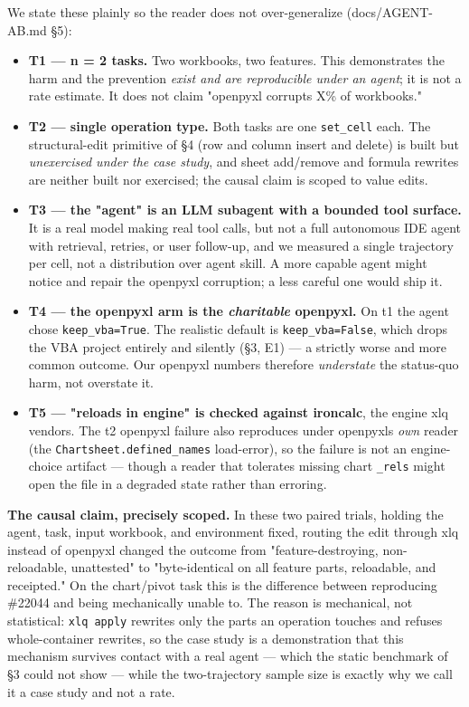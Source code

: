 \documentclass[
]{article}
\providecommand{\tightlist}{%
  \setlength{\itemsep}{0pt}\setlength{\parskip}{0pt}}
\begin{document}
We state these plainly so the reader does not over-generalize
(docs/AGENT-AB.md §5):

\begin{itemize}
\tightlist
\item
  \textbf{T1 --- n = 2 tasks.} Two workbooks, two features. This
  demonstrates the harm and the prevention \emph{exist and are
  reproducible under an agent}; it is not a rate estimate. It does not
  claim "openpyxl corrupts X\% of workbooks."
\item
  \textbf{T2 --- single operation type.} Both tasks are one
  \texttt{set\_cell} each. The structural-edit primitive of §4 (row and
  column insert and delete) is built but \emph{unexercised under the
  case study}, and sheet add/remove and formula rewrites are neither
  built nor exercised; the causal claim is scoped to value edits.
\item
  \textbf{T3 --- the "agent" is an LLM subagent with a bounded tool
  surface.} It is a real model making real tool calls, but not a full
  autonomous IDE agent with retrieval, retries, or user follow-up, and
  we measured a single trajectory per cell, not a distribution over
  agent skill. A more capable agent might notice and repair the openpyxl
  corruption; a less careful one would ship it.
\item
  \textbf{T4 --- the openpyxl arm is the \emph{charitable} openpyxl.} On
  t1 the agent chose \texttt{keep\_vba=True}. The realistic default is
  \texttt{keep\_vba=False}, which drops the VBA project entirely and
  silently (§3, E1) --- a strictly worse and more common outcome. Our
  openpyxl numbers therefore \emph{understate} the status-quo harm, not
  overstate it.
\item
  \textbf{T5 --- "reloads in engine" is checked against ironcalc}, the
  engine xlq vendors. The t2 openpyxl failure also reproduces under
  openpyxl\textquotesingle s \emph{own} reader (the
  \texttt{Chartsheet.defined\_names} load-error), so the failure is not
  an engine-choice artifact --- though a reader that tolerates missing
  chart \texttt{\_rels} might open the file in a degraded state rather
  than erroring.
\end{itemize}

\textbf{The causal claim, precisely scoped.} In these two paired trials,
holding the agent, task, input workbook, and environment fixed, routing
the edit through xlq instead of openpyxl changed the outcome from
"feature-destroying, non-reloadable, unattested" to "byte-identical on
all feature parts, reloadable, and receipted." On the chart/pivot task
this is the difference between reproducing \#22044 and being
mechanically unable to. The reason is mechanical, not statistical:
\texttt{xlq\ apply} rewrites only the parts an operation touches and
refuses whole-container rewrites, so the case study is a demonstration
that this mechanism survives contact with a real agent --- which the
static benchmark of §3 could not show --- while the two-trajectory
sample size is exactly why we call it a case study and not a rate.
\end{document}
